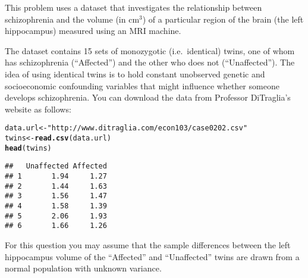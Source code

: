 \documentclass[addpoints,12pt]{exam}\usepackage[]{graphicx}\usepackage[]{color}
\makeatletter
\newcommand{\hlstr}[1]{\textcolor[rgb]{0.192,0.494,0.8}{#1}}%
\newcommand{\hlstd}[1]{\textcolor[rgb]{0.345,0.345,0.345}{#1}}%
\newcommand{\hlkwb}[1]{\textcolor[rgb]{0.69,0.353,0.396}{#1}}%
\newcommand{\hlkwd}[1]{\textcolor[rgb]{0.737,0.353,0.396}{\textbf{#1}}}%
\newenvironment{kframe}{%
 \def\at@end@of@kframe{}%
 \ifinner\ifhmode%
  \def\at@end@of@kframe{\end{minipage}}%
  \begin{minipage}{\columnwidth}%
 \fi\fi%
 \def\FrameCommand##1{\hskip\@totalleftmargin \hskip-\fboxsep
 \colorbox{shadecolor}{##1}\hskip-\fboxsep
     \hskip-\linewidth \hskip-\@totalleftmargin \hskip\columnwidth}%
 \MakeFramed {\advance\hsize-\width
   \@totalleftmargin\z@ \linewidth\hsize
   \@setminipage}}%
 {\par\unskip\endMakeFramed%
 \at@end@of@kframe}
\newenvironment{knitrout}{}{} %
\makeatother
\begin{document}
\begin{questions}

\question This problem uses a dataset that investigates the relationship between schizophrenia and the volume (in cm$^3$) of a particular region of the brain (the left hippocampus) measured using an MRI machine. 

The dataset contains 15 sets of monozygotic (i.e.\ identical) twins, one of whom has schizophrenia (``Affected'') and the other who does not (``Unaffected''). The idea of using identical twins is to hold constant unobserved genetic and socioeconomic confounding variables that might influence whether someone develops schizophrenia. You can download the data from Professor DiTraglia's website as follows:
\begin{knitrout}
\color{fgcolor}\begin{kframe}
\begin{alltt}
\hlstd{data.url} \hlkwb{<-} \hlstr{"http://www.ditraglia.com/econ103/case0202.csv"}
\hlstd{twins} \hlkwb{<-} \hlkwd{read.csv}\hlstd{(data.url)}
\hlkwd{head}\hlstd{(twins)}
\end{alltt}
\begin{verbatim}
##   Unaffected Affected
## 1       1.94     1.27
## 2       1.44     1.63
## 3       1.56     1.47
## 4       1.58     1.39
## 5       2.06     1.93
## 6       1.66     1.26
\end{verbatim}
\end{kframe}
\end{knitrout}
For this question you may assume that the sample differences between the left hippocampus volume of the ``Affected'' and ``Unaffected'' twins are drawn from a normal population with unknown variance.
	\begin{parts}

\end{parts}
\end{questions}
\end{document}
